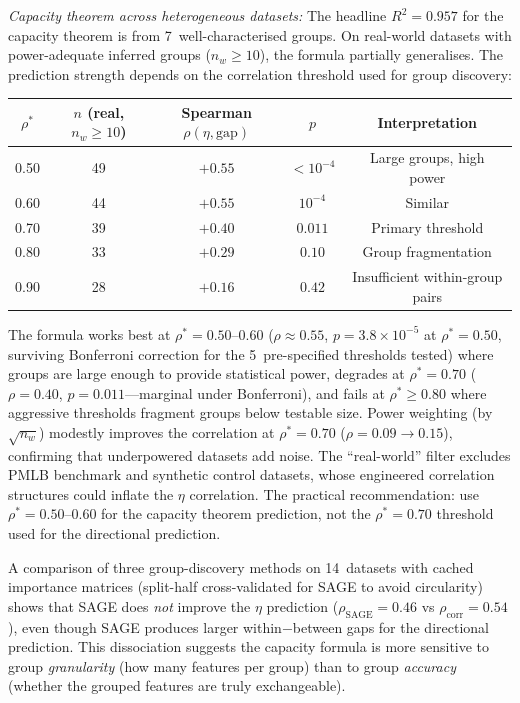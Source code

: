 \documentclass[11pt,a4paper]{article}
\begin{document}
\emph{Capacity theorem across heterogeneous datasets:}  The headline $R^2 = 0.957$ for the capacity theorem is from 7~well-characterised groups.  On real-world datasets with power-adequate inferred groups ($n_w \geq 10$), the formula partially generalises.  The prediction strength depends on the correlation threshold used for group discovery:

\begin{center}
\small
\begin{tabular}{@{}ccccc@{}}
\toprule
$\rho^*$ & $n$ (real, $n_w \geq 10$) & Spearman $\rho(\eta, \text{gap})$ & $p$ & Interpretation \\
\midrule
0.50 & 49 & $+0.55$ & $< 10^{-4}$ & Large groups, high power \\
0.60 & 44 & $+0.55$ & $10^{-4}$ & Similar \\
0.70 & 39 & $+0.40$ & $0.011$ & Primary threshold \\
0.80 & 33 & $+0.29$ & $0.10$ & Group fragmentation \\
0.90 & 28 & $+0.16$ & $0.42$ & Insufficient within-group pairs \\
\bottomrule
\end{tabular}
\end{center}

The formula works best at $\rho^* = 0.50$--$0.60$ ($\rho \approx 0.55$, $p = 3.8 \times 10^{-5}$ at $\rho^* = 0.50$, surviving Bonferroni correction for the 5~pre-specified thresholds tested) where groups are large enough to provide statistical power, degrades at $\rho^* = 0.70$ ($\rho = 0.40$, $p = 0.011$---marginal under Bonferroni), and fails at $\rho^* \geq 0.80$ where aggressive thresholds fragment groups below testable size.  Power weighting (by $\sqrt{n_w}$) modestly improves the correlation at $\rho^* = 0.70$ ($\rho = 0.09 \to 0.15$), confirming that underpowered datasets add noise.  The ``real-world'' filter excludes PMLB benchmark and synthetic control datasets, whose engineered correlation structures could inflate the $\eta$ correlation.  The practical recommendation: use $\rho^* = 0.50$--$0.60$ for the capacity theorem prediction, not the $\rho^* = 0.70$ threshold used for the directional prediction.

A comparison of three group-discovery methods on 14~datasets with cached importance matrices (split-half cross-validated for SAGE to avoid circularity) shows that SAGE does \emph{not} improve the $\eta$ prediction ($\rho_{\text{SAGE}} = 0.46$ vs $\rho_{\text{corr}} = 0.54$), even though SAGE produces larger within$-$between gaps for the directional prediction.  This dissociation suggests the capacity formula is more sensitive to group \emph{granularity} (how many features per group) than to group \emph{accuracy} (whether the grouped features are truly exchangeable).
\end{document}
